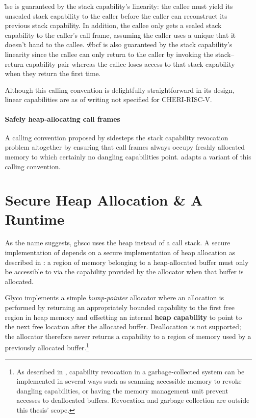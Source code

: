 \documentclass[main.tex]{subfiles}
\begin{document}
\G{lse} is guaranteed by the stack capability's linearity: the callee must yield its unsealed stack capability to the caller before the caller can reconstruct its previous stack capability. In addition, the callee only gets a sealed stack capability to the caller's call frame, assuming the caller uses a unique  that it doesn't hand to the callee. \G{wbcf} is also guaranteed by the stack capability's linearity since the callee can only return to the caller by invoking the stack–return capability pair whereas the callee loses access to that stack capability when they return the first time. 

Although this calling convention is delightfully straightforward in its design, linear capabilities are as of writing not specified for CHERI-RISC-V.

\paragraph{Safely heap-allocating call frames} A calling convention proposed by \cite[section~7.3]{cerise} sidesteps the stack capability revocation problem altogether by ensuring that call frames always occupy freshly allocated memory to which certainly no dangling capabilities point.  adapts a variant of this calling convention.

\section{Secure Heap Allocation \& A Runtime} \label{sct:ghscc-rt}
As the name suggests, \acrlong{ghscc} uses the heap instead of a call stack. A secure implementation of  depends on a secure implementation of heap allocation as described in \cite[section~7.1]{cerise}: a region of memory belonging to a heap-allocated buffer must only be accessible to  via the capability provided by the allocator when that buffer is allocated.

Glyco implements a simple \emph{bump-pointer} allocator where an allocation is performed by returning an appropriately bounded capability to the first free region in heap memory and offsetting an internal \textbf{heap capability} to point to the next free location after the allocated buffer. Deallocation is not supported; the allocator therefore never returns a capability to a region of memory used by a previously allocated buffer.\footnote{As described in \cite[section~2.3.16]{cheri}, capability revocation in a garbage-collected system can be implemented in several ways such as scanning accessible memory to revoke dangling capabilities, or having the memory management unit prevent accesses to deallocated buffers. Revocation and garbage collection are outside this thesis' scope.}
\end{document}
